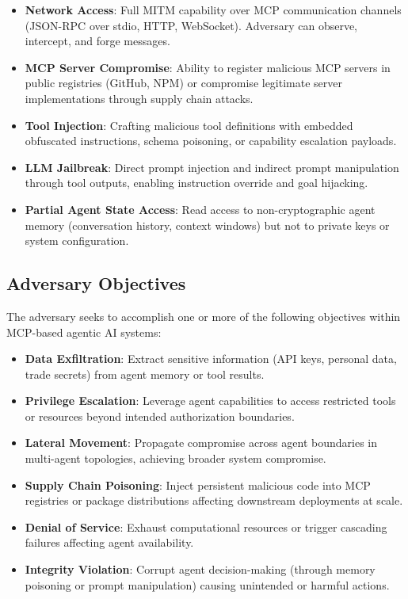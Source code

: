 \documentclass[12pt,twocolumn,journal]{IEEEtran}
\begin{document}
\begin{itemize}
\item \textbf{Network Access}: Full MITM capability over MCP communication channels (JSON-RPC over stdio, HTTP, WebSocket). Adversary can observe, intercept, and forge messages.
\item \textbf{MCP Server Compromise}: Ability to register malicious MCP servers in public registries (GitHub, NPM) or compromise legitimate server implementations through supply chain attacks.
\item \textbf{Tool Injection}: Crafting malicious tool definitions with embedded obfuscated instructions, schema poisoning, or capability escalation payloads.
\item \textbf{LLM Jailbreak}: Direct prompt injection and indirect prompt manipulation through tool outputs, enabling instruction override and goal hijacking.
\item \textbf{Partial Agent State Access}: Read access to non-cryptographic agent memory (conversation history, context windows) but not to private keys or system configuration.
\end{itemize}

\subsection{Adversary Objectives}

The adversary seeks to accomplish one or more of the following objectives within MCP-based agentic AI systems:

\begin{itemize}
\item \textbf{Data Exfiltration}: Extract sensitive information (API keys, personal data, trade secrets) from agent memory or tool results.
\item \textbf{Privilege Escalation}: Leverage agent capabilities to access restricted tools or resources beyond intended authorization boundaries.
\item \textbf{Lateral Movement}: Propagate compromise across agent boundaries in multi-agent topologies, achieving broader system compromise.
\item \textbf{Supply Chain Poisoning}: Inject persistent malicious code into MCP registries or package distributions affecting downstream deployments at scale.
\item \textbf{Denial of Service}: Exhaust computational resources or trigger cascading failures affecting agent availability.
\item \textbf{Integrity Violation}: Corrupt agent decision-making (through memory poisoning or prompt manipulation) causing unintended or harmful actions.
\end{itemize}
\end{document}
